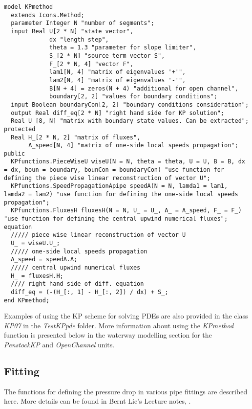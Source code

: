 \documentclass[%
]{USN-PhD}
\begin{document}
\begin{lstlisting}[language = modelica]
model KPmethod
  extends Icons.Method;
  parameter Integer N "number of segments";
  input Real U[2 * N] "state vector",
             dx "length step",
             theta = 1.3 "parameter for slope limiter",
             S_[2 * N] "source term vector S",
             F_[2 * N, 4] "vector F",
             lam1[N, 4] "matrix of eigenvalues '+'",
             lam2[N, 4] "matrix of eigenvalues '-'",
             B[N + 4] = zeros(N + 4) "additional for open channel",
             boundary[2, 2] "values for boundary conditions";
  input Boolean boundaryCon[2, 2] "boundary conditions consideration";
  output Real diff_eq[2 * N] "right hand side for KP solution";
  Real U_[8, N] "matrix with boundary state values. Can be extracted";
protected
  Real H_[2 * N, 2] "matrix of fluxes",
       A_speed[N, 4] "matrix of one-side local speeds propagation";
public
  KPfunctions.PieceWiseU wiseU(N = N, theta = theta, U = U, B = B, dx = dx, boun = boundary, bounCon = boundaryCon) "use function for defining the piece wise linear reconstruction of vector U";
  KPfunctions.SpeedPropagationApipe speedA(N = N, lamda1 = lam1, lamda2 = lam2) "use function for defining the one-side local speeds propagation";
  KPfunctions.FluxesH fluxesH(N = N, U_ = U_, A_ = A_speed, F_ = F_) "use function for defining the central upwind numerical fluxes";
equation
  ///// piece wise linear reconstruction of vector U
  U_ = wiseU.U_;
  ///// one-side local speeds propagation
  A_speed = speedA.A;
  ///// central upwind numerical fluxes
  H_ = fluxesH.H;
  //// right hand side of diff. equation
  diff_eq = (-(H_[:, 1] - H_[:, 2]) / dx) + S_;
end KPmethod;
\end{lstlisting}

Examples of using the KP scheme for solving PDEs are also provided in the class \emph{KP07} in the \emph{TestKPpde} folder. More information about using the \emph{KPmethod} function is presented below in the waterway modelling section for the \emph{PenstockKP} and \emph{OpenChannel} units.

\subsection{Fitting}

The functions for defining the pressure drop in various pipe fittings are described here. More details can be found in Bernt Lie's Lecture notes, \cite{LieL:18}.
\end{document}

